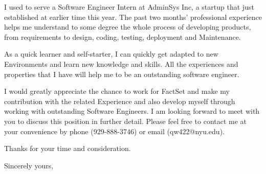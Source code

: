 \documentclass[11pt]{letter} %
\begin{document}
\begin{letter}{}
I used to serve a Software Engineer Intern at AdminSys Inc, a startup that just established at earlier time this year. The past two months’ professional experience helps me understand to some degree the whole process of developing products, from requirements to design, coding, testing, deployment and Maintenance.

As a quick learner and self-starter, I can quickly get adapted to new Environments and learn new knowledge and skills. All the experiences and properties that I have will help me to be an outstanding software engineer. 

I would greatly appreciate the chance to work for FactSet and make my contribution with the related Experience and also develop myself through working with outstanding Software Engineers. I am looking forward to meet with you to discuss this position in further detail. Please feel free to contact me at your convenience by phone (929-888-3746) or email (qw422@nyu.edu).

Thanks for your time and consideration.

\closing{Sincerely yours,}




\end{letter}
\end{document}
